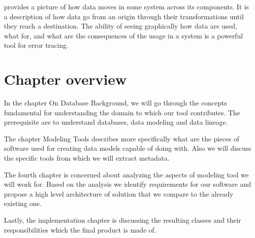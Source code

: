  provides a picture of how data moves in some system across its components. It is a description of how data go from an origin through their transformations until they reach a destination. 
The ability of seeing graphically how data are used, what for, and what are the consequences of the usage in a system is a powerful tool for error tracing. \\

\section{Chapter overview}

In the chapter On Database Background, we will go through the concepts fundamental for understanding the domain to which our tool contributes. The prerequisite are to understand databases, data modeling and data lineage.

The chapter Modeling Tools describes more specifically what are the pieces of software used for creating data models capable of doing with.
Also we will discuss the specific tools from which we will extract metadata.

The fourth chapter is concerned about analyzing the aspects of modeling tool we will work for. Based on the analysis we identify requirements for our software and propose a high level architecture of solution that we compare to the already existing one.

Lastly, the implementation chapter is discussing the resulting classes and their responsibilities which the final product is made of.



